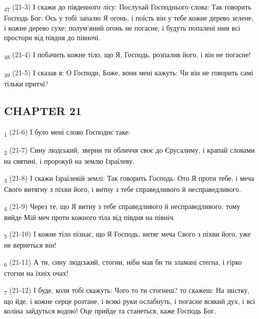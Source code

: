 \begin{tcolorbox}
\textsubscript{47} (21-3) І скажи до південного лісу: Послухай Господнього слова: Так говорить Господь Бог: Ось у тобі запалю Я огонь, і поїсть він у тебе кожне дерево зелене, і кожне дерево сухе; полум'яний огонь не погасне, і будуть попалені ним всі простори від півдня до півночі.
\end{tcolorbox}
\begin{tcolorbox}
\textsubscript{48} (21-4) І побачить кожне тіло, що Я, Господь, розпалив його, і він не погасне!
\end{tcolorbox}
\begin{tcolorbox}
\textsubscript{49} (21-5) І сказав я: О Господи, Боже, вони мені кажуть: Чи він не говорить самі тільки притчі?
\end{tcolorbox}
\subsection{CHAPTER 21}
\begin{tcolorbox}
\textsubscript{1} (21-6) І було мені слово Господнє таке:
\end{tcolorbox}
\begin{tcolorbox}
\textsubscript{2} (21-7) Сину людський, зверни ти обличчя своє до Єрусалиму, і крапай словами на святині, і пророкуй на землю Ізраїлеву.
\end{tcolorbox}
\begin{tcolorbox}
\textsubscript{3} (21-8) І скажи Ізраїлевій землі: Так говорить Господь: Ото Я проти тебе, і меча Свого витягну з піхви його, і витну з тебе справедливого й несправедливого.
\end{tcolorbox}
\begin{tcolorbox}
\textsubscript{4} (21-9) Через те, що Я витну з тебе справедливого й несправедливого, тому вийде Мій меч проти кожного тіла від півдня на північ.
\end{tcolorbox}
\begin{tcolorbox}
\textsubscript{5} (21-10) І кожне тіло пізнає, що Я Господь, витяг меча Свого з піхви його, уже не вернеться він!
\end{tcolorbox}
\begin{tcolorbox}
\textsubscript{6} (21-11) А ти, сину людський, стогни, ніби мав би ти зламані стегна, і гірко стогни на їхніх очах!
\end{tcolorbox}
\begin{tcolorbox}
\textsubscript{7} (21-12) І буде, коли тобі скажуть: Чого то ти стогнеш? то скажеш: На звістку, що йде, і кожне серце розтане, і всякі руки ослабнуть, і погасне всякий дух, і всі коліна зайдуться водою! Оце прийде та станеться, каже Господь Бог.
\end{tcolorbox}
